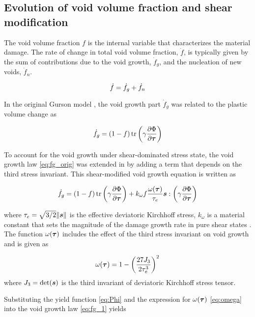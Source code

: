 \subsection{Evolution of void volume fraction and shear modification}
The void volume fraction $f$ is the internal variable that
characterizes the material damage. The rate of change in total void
volume fraction, $\dot{f}$, is typically given by the sum of
contributions due to the void growth, $\dot{f}_g$, and the nucleation
of new voids, $\dot{f}_{n}$.

\begin{equation}\label{eq:dotf}
\dot{f} = \dot{f}_g + \dot{f}_{n}\\
\end{equation}

In the original Gurson model \cite{Gurson1977}, the void growth part
$\dot{f}_g$ was related to the plastic volume change as

\begin{equation}\label{eq:fg_orig}
\dot{f}_g = (1-f)\operatorname{\text{tr}}\left( \gamma\frac{\partial\Phi}{\partial{\boldsymbol{\tau}}}
\right)
\end{equation}

To account for the void growth under shear-dominated stress state, 
the void growth law \eqref{eq:fg_orig} was extended in
\cite{Nahshon2008} by adding a term that depends on the third stress 
invariant. This shear-modified void growth equation is written as

\begin{equation}\label{eq:fg_1}
\dot{f}_g = (1-f)\operatorname{\text{tr}}\left( \gamma\frac{\partial\Phi}{\partial{\boldsymbol{\tau}}}
\right) + k_{\omega}f\frac{\omega({\boldsymbol{\tau}})}{\tau_e}{\boldsymbol{s}}: \left(
\gamma\frac{\partial\Phi}{\partial{\boldsymbol{\tau}}} \right)
\end{equation}

where $\tau_e=\sqrt{3/2}\|{\boldsymbol{s}}\|$ is the effective deviatoric 
Kirchhoff stress, $k_{\omega}$ is a material constant that sets the 
magnitude of the damage growth rate in pure shear states 
\cite{Nahshon2008}. The function $\omega({\boldsymbol{\tau}})$ includes the effect 
of the third stress invariant on void growth and is given as

\begin{equation}\label{eq:omega}
\omega({\boldsymbol{\tau}}) = 1- \left(\frac{27J_3}{2\tau_e^3}\right)^2
\end{equation}
where $J_3=\det({\boldsymbol{s}})$ is the third invariant of deviatoric Kirchhoff
stress tensor.

Substituting the yield function \eqref{eq:Phi} and the expression for
$\omega({\boldsymbol{\tau}})$ \eqref{eq:omega} into the void growth law
\eqref{eq:fg_1} yields

